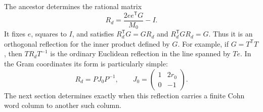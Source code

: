 The ancestor determines the rational matrix
\begin{equation}\label{eq:ancestor-reflection}
 R_d=\frac{2ee^{\mathsf T}G}{M_0}-I.
\end{equation}
It fixes $e$, squares to $I$, and satisfies
$R_d^{\mathsf T}G=GR_d$ and $R_d^{\mathsf T}GR_d=G$.
Thus it is an orthogonal reflection for the inner product defined by
$G$. For example, if $G=T^{\mathsf T}T$, then $TR_dT^{-1}$ is the
ordinary Euclidean reflection in the line spanned by $Te$.
In the Gram coordinates its form is particularly simple:
\begin{equation}\label{eq:gram-reflection}
 R_d=PJ_0P^{-1},\qquad
 J_0=\begin{pmatrix}1&2r_0\\0&-1\end{pmatrix}.
\end{equation}
The next section determines exactly when this reflection carries a
finite Cohn word column to another such column.
